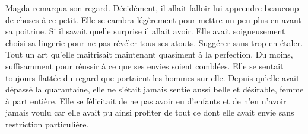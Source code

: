 Magda remarqua son regard. Décidément, il allait falloir lui apprendre beaucoup de choses à ce petit. Elle se cambra
légèrement pour mettre un peu plus en avant sa poitrine. Si il savait quelle surprise il allait avoir. Elle avait
soigneusement choisi sa lingerie pour ne pas révéler tous ses atouts. Suggérer sans trop en étaler. Tout un art qu'elle
maîtrisait maintenant quasiment à la perfection. Du moins, suffisamment pour réussir à ce que ses envies soient
comblées. Elle se sentait toujours flattée du regard que portaient les hommes sur elle. Depuis qu'elle avait dépassé la
quarantaine, elle ne s'était jamais sentie aussi belle et désirable, femme à part entière.  Elle se félicitait de ne pas 
avoir eu d'enfants et de n'en n'avoir jamais voulu car elle avait pu ainsi profiter de tout ce dont elle avait envie sans 
restriction particulière.
